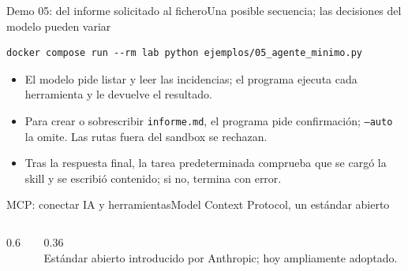 \begin{frame}[fragile]{Demo 05: del informe solicitado al fichero}{Una posible secuencia; las decisiones del modelo pueden variar}
	\begin{lstlisting}[language={}]
docker compose run --rm lab python ejemplos/05_agente_minimo.py
\end{lstlisting}
	\begin{center}
	\end{center}
	\begin{itemize}
		\footnotesize
		\item El modelo pide listar y leer las incidencias; el programa ejecuta cada herramienta y le devuelve el resultado.
		\item Para crear o sobrescribir \texttt{informe.md}, el programa pide confirmación; \texttt{--auto} la omite. Las rutas fuera del sandbox se rechazan.
		\item Tras la respuesta final, la tarea predeterminada comprueba que se cargó la skill y se escribió contenido; si no, termina con error.
	\end{itemize}
\end{frame}

\begin{frame}{MCP: conectar IA y herramientas}{Model Context Protocol, un estándar abierto}
	\begin{columns}[c]
		\begin{column}{0.6\textwidth}
			\centering
		\end{column}
		\begin{column}{0.36\textwidth}
			\\[6pt]
			{\footnotesize Estándar abierto introducido por Anthropic; hoy ampliamente adoptado.}
		\end{column}
	\end{columns}
\end{frame}

